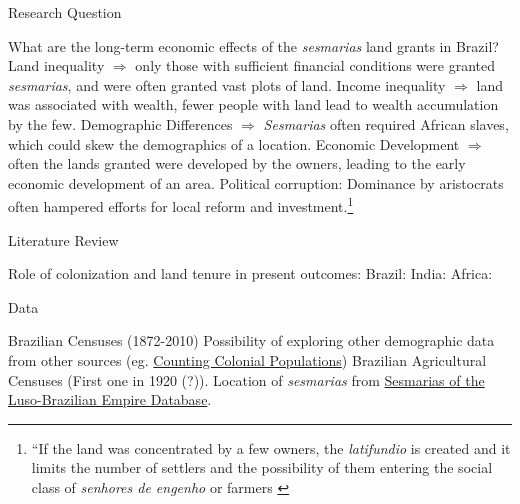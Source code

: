 \documentclass[aspectratio=1610, handout]{beamer}
\begin{document}
\begin{frame}{Research Question}
    \begin{outline}
        \1 What are the long-term economic effects of the \textit{sesmarias} land grants in Brazil?
            \2 Land inequality $\Rightarrow$ only those with sufficient financial conditions were granted \textit{sesmarias}, and were often granted vast plots of land.
            \2 Income inequality $\Rightarrow$ land was associated with wealth, fewer people with land lead to wealth accumulation by the few.
            \2 Demographic Differences $\Rightarrow$ \textit{Sesmarias} often required African slaves, which could skew the demographics of a location.
            \2 Economic Development $\Rightarrow$ often the lands granted were developed by the owners, leading to the early economic development of an area.
            \2 Political corruption: Dominance by aristocrats often hampered efforts for local reform and investment.\footnote[frame,1]{``If the land was concentrated by a few owners, the \textit{latifundio} is created and it limits the number of settlers and the possibility of them entering the social class of \textit{senhores de engenho} or farmers \parencite[p.~40]{Bandecchi1963-uj}}
    \end{outline}
\end{frame}

\begin{frame}{Literature Review}
    \begin{outline}
        \1 Role of colonization and land tenure in present outcomes:
            \2 Brazil: \cites{Naritomi2012-or}{Musacchio2014-pq}{Wigton-Jones2020-ex}{Laudares2022-vy}
            \2 India: \cites{Banerjee2005-ki}
            \2 Africa: \cites{Lowes2020-pr}
    \end{outline}
\end{frame}

\begin{frame}{Data}
    \begin{outline}
        \1 Brazilian Censuses (1872-2010)
            \2 Possibility of exploring other demographic data from other sources (eg. \href{http://colonialpopulations.fcsh.unl.pt/mainEnglish.php}{Counting Colonial Populations})
        \1 Brazilian Agricultural Censuses (First one in 1920 (?)).
        \1 Location of \textit{sesmarias} from \href{http://plataformasilb.cchla.ufrn.br/}{Sesmarias of the Luso-Brazilian Empire Database}.
    \end{outline}
\end{frame}
\end{document}
